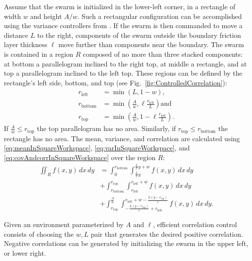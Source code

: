 Assume that the swarm is initialized in the lower-left corner, in a rectangle of width $w$ and height $A/w$. 
 Such a rectangular configuration can be accomplished using the variance controllers from \cite{ShahrokhiIROS2015}. 
  If the swarm is then commanded to move a distance $L$ to the right, components of the swarm outside the boundary friction layer thickness $\ell$ move further than components near the boundary. 
   The swarm is contained in a region $R$ composed of no more than three stacked components: at bottom a parallelogram inclined to the right top, at middle a rectangle, and at top a parallelogram inclined to the left top. These regions can be defined by the rectangle's left side, bottom, and top (see Fig.~\ref{fig:ControlledCorrelation}):
\begin{align}
r_{\text{left}} &= \min \left(L,1-w \right),\nonumber \\
r_{\text{bottom}} &=\min \left(\frac{A}{w}, \ell\frac{r_{\textrm{left}}}{L}  \right) \text{and}\nonumber \\
r_{\text{top}}  &= \min \left(\frac{A}{w}, 1-\ell\frac{r_{\text{left}}}{L}  \right).
\end{align}
If $\frac{A}{w} \le r_{\text{top}}$ the top parallelogram has no area. 
 Similarly, if $r_{\text{top}} \le r_{\text{bottom}}$ the rectangle has no area. 
The mean, variance, and correlation are calculated  using \eqref{eq:meanInSquareWorkspace}, \eqref{eq:varInSquareWorkspace}, and \eqref{eq:covAndcorrInSquareWorkspace} over the region $R$:
\begin{align}
 \iint_R f(x,y) \, dx \,dy 
 &=  \int_0^{r_{\text{bottom}}}  \int_{\frac{L}{\ell}y}^{\frac{L}{\ell}y+w}  f(x,y)  \, dx \, dy \label{eq:correlationFriction} \\
&+\int_{r_{\text{bottom}}}^{r_{\text{top}}} \int_{r_{\text{left}}}^{r_{\text{left}} +w} f(x,y)   \,  dx \, dy \nonumber\\
&+\int_{r_{\text{top}}}^{\frac{A}{w}} \int_{-\frac{L (y-r_{\text{top}})}{\ell}+r_{\text{left}}}^{r_{\text{left}}+w-\frac{L (y-r_{\text{top}})}{\ell}} f(x,y)  \,  dx \, dy .\nonumber
\end{align}
 
 Given an environment parameterized by $A$ and $\ell$, efficient correlation control consists of choosing the $w,L$ pair  that generates the desired positive correlation.
  Negative correlations can be generated by initializing the swarm in the upper left, or lower right.

